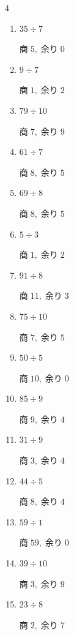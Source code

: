 \begin{multicols}{4}
\begin{enumerate}
\columnbreak %

  \item $35 \div 7$

        $商\; 5,\; 余り\; 0$

  \item $9 \div 7$

        $商\; 1,\; 余り\; 2$

  \item $79 \div 10$

        $商\; 7,\; 余り\; 9$

  \item $61 \div 7$

        $商\; 8,\; 余り\; 5$

  \item $69 \div 8$

        $商\; 8,\; 余り\; 5$

  \item $5 \div 3$

        $商\; 1,\; 余り\; 2$

  \item $91 \div 8$

        $商\; 11,\; 余り\; 3$

  \item $75 \div 10$

        $商\; 7,\; 余り\; 5$

  \item $50 \div 5$

        $商\; 10,\; 余り\; 0$

  \item $85 \div 9$

        $商\; 9,\; 余り\; 4$

  \item $31 \div 9$

        $商\; 3,\; 余り\; 4$

  \item $44 \div 5$

        $商\; 8,\; 余り\; 4$

  \item $59 \div 1$

        $商\; 59,\; 余り\; 0$

  \item $39 \div 10$

        $商\; 3,\; 余り\; 9$

  \item $23 \div 8$

        $商\; 2,\; 余り\; 7$


\end{enumerate}
\end{multicols}
